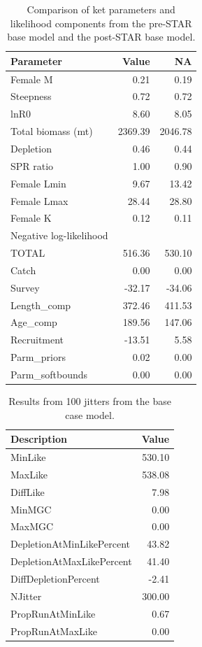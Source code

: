 \documentclass[12pt,]{article}
\begin{document}
\begin{table}[ht]
\centering
\caption{Comparison of ket parameters and likelihood 
                                            components from the pre-STAR base model and the 
                                            post-STAR base model.} 
\label{tab:preSTAR_postSTAR_compare}
\begin{tabular}{lrr}
  \hline
Parameter & Value & NA \\ 
  \hline
Female M & 0.21 & 0.19 \\ 
  Steepness & 0.72 & 0.72 \\ 
  lnR0 & 8.60 & 8.05 \\ 
  Total biomass (mt) & 2369.39 & 2046.78 \\ 
  Depletion & 0.46 & 0.44 \\ 
  SPR ratio & 1.00 & 0.90 \\ 
  Female Lmin & 9.67 & 13.42 \\ 
  Female Lmax & 28.44 & 28.80 \\ 
  Female K & 0.12 & 0.11 \\ 
  Negative log-likelihood &  &  \\ 
  TOTAL & 516.36 & 530.10 \\ 
  Catch & 0.00 & 0.00 \\ 
  Survey & -32.17 & -34.06 \\ 
  Length\_comp & 372.46 & 411.53 \\ 
  Age\_comp & 189.56 & 147.06 \\ 
  Recruitment & -13.51 & 5.58 \\ 
  Parm\_priors & 0.02 & 0.00 \\ 
  Parm\_softbounds & 0.00 & 0.00 \\ 
   \hline
\end{tabular}
\end{table}

\begin{table}[ht]
\centering
\caption{Results from 100 jitters from the base 
                                      case model.} 
\label{tab:jitter}
\begin{tabular}{lr}
  \hline
Description & Value \\ 
  \hline
MinLike & 530.10 \\ 
  MaxLike & 538.08 \\ 
  DiffLike & 7.98 \\ 
  MinMGC & 0.00 \\ 
  MaxMGC & 0.00 \\ 
  DepletionAtMinLikePercent & 43.82 \\ 
  DepletionAtMaxLikePercent & 41.40 \\ 
  DiffDepletionPercent & -2.41 \\ 
  NJitter & 300.00 \\ 
  PropRunAtMinLike & 0.67 \\ 
  PropRunAtMaxLike & 0.00 \\ 
   \hline
\end{tabular}
\end{table}
\end{document}

